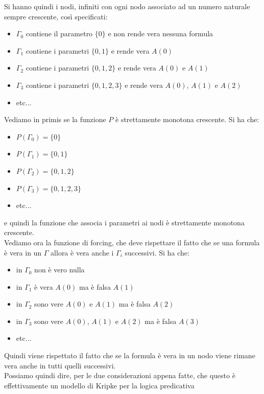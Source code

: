 \documentclass[a4paper,12pt, oneside]{book}
\begin{document}
\begin{esempio}
\begin{figure}[H]
  \end{figure}
  Si hanno quindi i nodi, infiniti con ogni nodo associato ad un numero naturale
  sempre crescente, così specificati:
  \begin{itemize}
    \item $\Gamma_0$ contiene il parametro $\{0\}$ e non rende vera nessuna
    formula 
    \item $\Gamma_1$ contiene i parametri $\{0,1\}$ e rende vera $A(0)$
    \item $\Gamma_2$ contiene i parametri $\{0,1,2\}$ e rende vera $A(0)$ e
    $A(1)$ 
    \item $\Gamma_3$ contiene i parametri $\{0,1,2,3\}$ e rende vera $A(0)$,
    $A(1)$ e $A(2)$
    \item etc$\ldots$
  \end{itemize}
  Vediamo in primis se la funzione $P$ è strettamente monotona crescente. Si ha
  che: 
  \begin{itemize}
    \item $P(\Gamma_0)=\{0\}$
    \item $P(\Gamma_1)=\{0,1\}$
    \item $P(\Gamma_2)=\{0,1,2\}$
    \item $P(\Gamma_3)=\{0,1,2,3\}$
    \item etc$\ldots$
  \end{itemize}
  e quindi la funzione che associa i parametri ai nodi è strettamente monotona
  crescente.\\ 
  Vediamo ora la funzione di forcing, che deve rispettare il fatto che se una
  formula è vera in un $\Gamma$ allora è vera anche i $\Gamma_i$ successivi. Si
  ha che:
  \begin{itemize}
    \item in $\Gamma_0$ non è vero nulla
    \item in $\Gamma_1$ è vera $A(0)$ ma è falsa $A(1)$
    \item in $\Gamma_2$ sono vere $A(0)$ e $A(1)$ ma è falsa $A(2)$
    \item in $\Gamma_3$ sono vere $A(0)$, $A(1)$ e $A(2)$ ma è falsa $A(3)$
    \item etc$\ldots$
  \end{itemize}
  Quindi viene rispettato il fatto che se la formula è vera in un nodo viene
  rimane vera anche in tutti quelli successivi.\\
  Possiamo quindi dire, per le due considerazioni appena fatte, che questo è
  effettivamente un modello di Kripke per la logica predicativa

\end{esempio}
\end{document}
